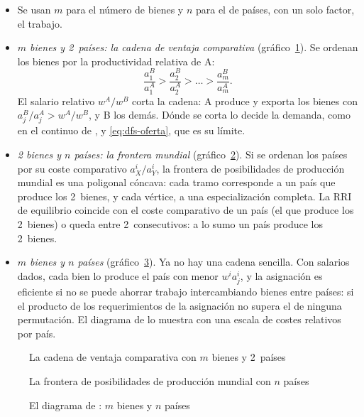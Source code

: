 \documentclass[11pt]{article}
\begin{document}
\begin{itemize}
\item Se usan $m$ para el número de bienes y $n$ para el de países, con un solo factor, el trabajo\nocite{Gandolfo2014International}.
\item \emph{$m$ bienes y 2~países: la cadena de ventaja comparativa} (gráfico~\ref{fig:cadena-ventaja}). Se ordenan los bienes por la productividad relativa de A:
  \[\frac{a_1^B}{a_1^A}>\frac{a_2^B}{a_2^A}>\dots>\frac{a_m^B}{a_m^A}.\]
  El salario relativo $w^A/w^B$ corta la cadena: A produce y exporta los bienes con $a_j^B/a_j^A>w^A/w^B$, y B los demás. Dónde se corta lo decide la demanda, como en el continuo de ,  y  \eqref{eq:dfs-oferta}, que es su límite.
\item \emph{2 bienes y $n$ países: la frontera mundial} (gráfico~\ref{fig:frontera-mundial}). Si se ordenan los países por su coste comparativo $a_X^i/a_Y^i$, la frontera de posibilidades de producción mundial es una poligonal cóncava: cada tramo corresponde a un país que produce los 2~bienes, y cada vértice, a una especialización completa. La RRI de equilibrio coincide con el coste comparativo de un país (el que produce los 2~bienes) o queda entre 2~consecutivos: a lo sumo un país produce los 2~bienes.
\item \emph{$m$ bienes y $n$ países} (gráfico~\ref{fig:viner}). Ya no hay una cadena sencilla. Con salarios dados, cada bien lo produce el país con menor $w^ia_j^i$, y la asignación es eficiente si no se puede ahorrar trabajo intercambiando bienes entre países: si el producto de los requerimientos de la asignación no supera el de ninguna permutación\nocite{Jones1961Comparative}. El diagrama de  lo muestra con una escala de costes relativos por país.
\end{itemize}
\begin{figure}[H]
\centering
\caption{La cadena de ventaja comparativa con $m$ bienes y 2~países}\label{fig:cadena-ventaja}
\end{figure}
\begin{figure}[H]
\centering
\caption{La frontera de posibilidades de producción mundial con $n$ países}\label{fig:frontera-mundial}
\end{figure}
\begin{figure}[H]
\centering
\caption{El diagrama de : $m$ bienes y $n$ países}\label{fig:viner}
\end{figure}
\end{document}
